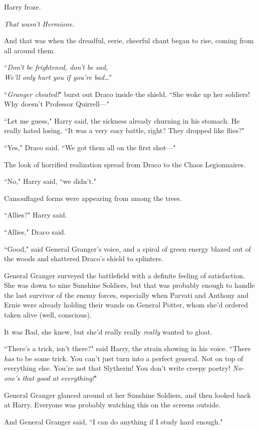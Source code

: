 Harry froze.

\emph{That wasn't Hermione.}

And that was when the dreadful, eerie, cheerful chant began to rise, coming from all around them.

``\emph{Don't be frightened, don't be sad,\\
We'll only hurt you if you're bad{\ldots}}"

``\emph{Granger cheated!}" burst out Draco inside the shield. ``She woke up her soldiers! Why doesn't Professor Quirrell—"

``Let me guess," Harry said, the sickness already churning in his stomach. He really hated losing. ``It was a very easy battle, right? They dropped like flies?"

``Yes," Draco said. ``We got them all on the first shot—"

The look of horrified realization spread from Draco to the Chaos Legionnaires.

``No," Harry said, ``we didn't."

Camouflaged forms were appearing from among the trees.

``Allies?" Harry said.

``Allies," Draco said.

``Good," said General Granger's voice, and a spiral of green energy blazed out of the woods and shattered Draco's shield to splinters.

\later

General Granger surveyed the battlefield with a definite feeling of satisfaction. She was down to nine Sunshine Soldiers, but that was probably enough to handle the last survivor of the enemy forces, especially when Parvati and Anthony and Ernie were already holding their wands on General Potter, whom she'd ordered taken alive (well, conscious).

It was Bad, she knew, but she'd really really \emph{really} wanted to gloat.

``There's a trick, isn't there?" said Harry, the strain showing in his voice. ``There \emph{has} to be some trick. You can't just turn into a perfect general. Not on top of everything else. You're not that Slytherin! You don't write creepy poetry! \emph{No-one's that good at everything!}"

General Granger glanced around at her Sunshine Soldiers, and then looked back at Harry. Everyone was probably watching this on the screens outside.

And General Granger said, ``I can do anything if I study hard enough."

